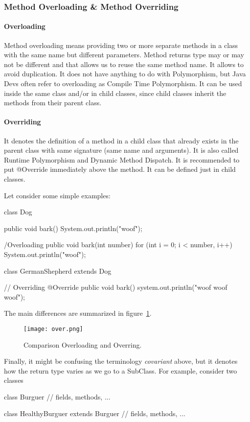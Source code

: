 \subsubsection{Method Overloading \& Method Overriding}

\paragraph{Overloading} Method overloading means providing two or more separate methods in a 
class with the same name but different parameters. Method returns type may or may not be 
different and that allows us to reuse the same method name. It allows to avoid duplication. 
It does not have anything to do with Polymorphism, but Java Devs often refer to overloading as 
Compile Time Polymorphism. It can be used inside the same class and/or in child classes, since child 
classes inherit the methods from their parent class. 

\paragraph{Overriding} It denotes the definition of a method in a child class that already exists 
in the parent class with same signature (same name and arguments). It is also called Runtime 
Polymorphism and Dynamic Method Dispatch. It is recommended to put @Override immediately above 
the method. It can be defined just in child classes.

Let consider some simple examples: 
\begin{listing}{1}
class Dog { 
    public void bark() {
        System.out.println("woof");
    }

    /Overloading
    public void bark(int number) {
        for (int i = 0; i < number, i++) {
            System.out.println("woof");
        }
    }
}

class GermanShepherd extends Dog {
    
    // Overriding 
    @Override 
    public void bark() { 
        system.out.println("woof woof woof");
    }
}
\end{listing}

The main differences are summarized in figure~\ref{fig:over}.
\begin{figure}[htb!]
	\texttt{[image: over.png]}
    \caption{Comparison Overloading and Overring.}
	\label{fig:over}
\end{figure}

Finally, it might be confusing the terminology \emph{covariant} above, but it 
denotes how the return type varies as we go to a SubClass. For example, consider 
two classes
\begin{listing}{1}
class Burguer {
// fields, methods, ...
}

class HealthyBurguer extends Burguer {
// fields, methods, ...
}
\end{listing}

